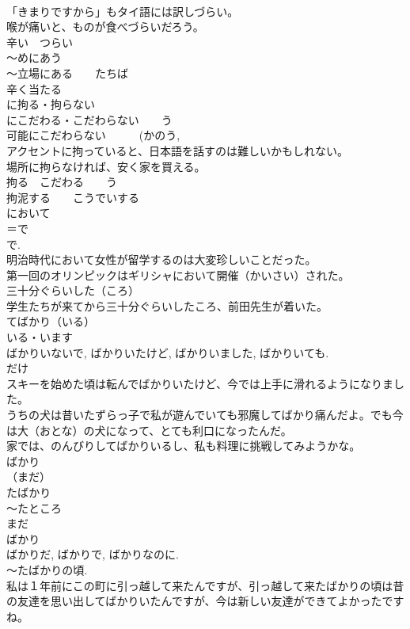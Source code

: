 \documentclass[8pt]{extreport}
\begin{document}
\begin{CJK}{UTF8}{min}
\\	「きまりですから」もタイ語には訳しづらい。
\\	喉が痛いと、ものが食べづらいだろう。
\\	辛い　つらい
\\	～めにあう
\\	～立場にある　　たちば
\\	辛く当たる
\\	に拘る・拘らない
\\	にこだわる・こだわらない　　う
\\	可能にこだわらない　　　(かのう, 
\\	アクセントに拘っていると、日本語を話すのは難しいかもしれない。
\\	場所に拘らなければ、安く家を買える。
\\	拘る　こだわる　　う
\\	拘泥する　　こうでいする
\\	において
\\	＝で 
\\	で.
\\	明治時代において女性が留学するのは大変珍しいことだった。
\\	第一回のオリンピックはギリシャにおいて開催（かいさい）された。
\\	三十分ぐらいした（ころ）
\\	学生たちが来てから三十分ぐらいしたころ、前田先生が着いた。	
\\	てばかり（いる）
\\	いる・います 
\\	ばかりいないで, ばかりいたけど, ばかりいました, ばかりいても.
\\	だけ
\\	スキーを始めた頃は転んでばかりいたけど、今では上手に滑れるようになりました。
\\	うちの犬は昔いたずらっ子で私が遊んでいても邪魔してばかり痛んだよ。でも今は大（おとな）の犬になって、とても利口になったんだ。
\\	家では、のんびりしてばかりいるし、私も料理に挑戦してみようかな。
\\	ばかり
\\	（まだ）
\\	たばかり
\\	～たところ
\\	まだ 
\\	ばかり 
\\	ばかりだ, ばかりで, ばかりなのに.
\\	～たばかりの頃. 
\\	私は１年前にこの町に引っ越して来たんですが、引っ越して来たばかりの頃は昔の友達を思い出してばかりいたんですが、今は新しい友達ができてよかったですね。

\end{CJK}
\end{document}
